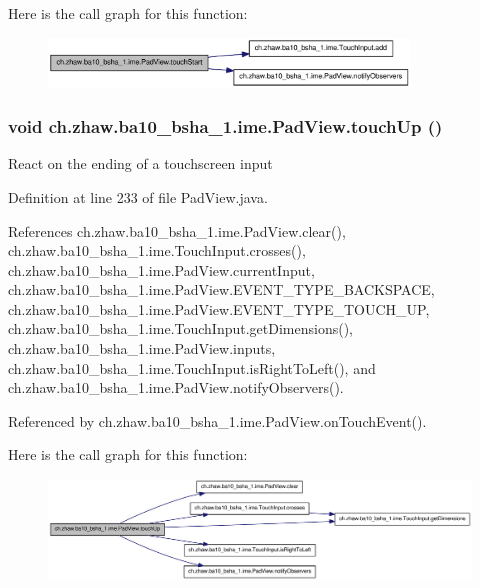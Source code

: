 Here is the call graph for this function:\nopagebreak
\begin{figure}[H]
\begin{center}
\leavevmode
\includegraphics[width=272pt]{classch_1_1zhaw_1_1ba10__bsha__1_1_1ime_1_1PadView_aa6c73f1271801bab9f52b52e53ca9c06_cgraph}
\end{center}
\end{figure}
\hypertarget{classch_1_1zhaw_1_1ba10__bsha__1_1_1ime_1_1PadView_ac4eee83441a5d6f625582acf5a1d7d03}{
\subsubsection[{touchUp}]{\setlength{\rightskip}{0pt plus 5cm}void ch.zhaw.ba10\_\-bsha\_\-1.ime.PadView.touchUp ()}}
\label{classch_1_1zhaw_1_1ba10__bsha__1_1_1ime_1_1PadView_ac4eee83441a5d6f625582acf5a1d7d03}
React on the ending of a touchscreen input 

Definition at line 233 of file PadView.java.

References ch.zhaw.ba10\_\-bsha\_\-1.ime.PadView.clear(), ch.zhaw.ba10\_\-bsha\_\-1.ime.TouchInput.crosses(), ch.zhaw.ba10\_\-bsha\_\-1.ime.PadView.currentInput, ch.zhaw.ba10\_\-bsha\_\-1.ime.PadView.EVENT\_\-TYPE\_\-BACKSPACE, ch.zhaw.ba10\_\-bsha\_\-1.ime.PadView.EVENT\_\-TYPE\_\-TOUCH\_\-UP, ch.zhaw.ba10\_\-bsha\_\-1.ime.TouchInput.getDimensions(), ch.zhaw.ba10\_\-bsha\_\-1.ime.PadView.inputs, ch.zhaw.ba10\_\-bsha\_\-1.ime.TouchInput.isRightToLeft(), and ch.zhaw.ba10\_\-bsha\_\-1.ime.PadView.notifyObservers().

Referenced by ch.zhaw.ba10\_\-bsha\_\-1.ime.PadView.onTouchEvent().

Here is the call graph for this function:\nopagebreak
\begin{figure}[H]
\begin{center}
\leavevmode
\includegraphics[width=411pt]{classch_1_1zhaw_1_1ba10__bsha__1_1_1ime_1_1PadView_ac4eee83441a5d6f625582acf5a1d7d03_cgraph}
\end{center}
\end{figure}


